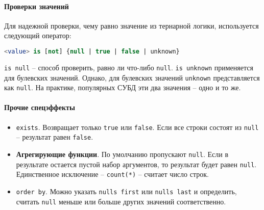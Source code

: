 \paragraph{Проверки значений}

Для надежной проверки, чему равно значение из тернарной логики, используется следующий оператор:

\begin{lstlisting}[language=SQL]
    <value> is [not] {null | true | false | unknown}
\end{lstlisting}

\texttt{is null} -- способ проверить, равно ли что-либо \texttt{null}.
\texttt{is unknown}
применяется для булевских значений. Однако, для булевских значений \texttt{unknown}
представляется как \texttt{null}. На практике, популярных СУБД эти два значения -- одно и
то же.

\paragraph{Прочие спецэффекты}

\begin{itemize}
	\item \texttt{exists}. Возвращает только \texttt{true} или \texttt{false}. Если
	      все строки
	      состоят из \texttt{null} -- результат равен \texttt{false}.
	\item \textbf{Агрегирующие функции}. По умолчанию пропускают \texttt{null}. Если в результате
	      остается пустой набор аргументов, то результат будет равен \texttt{null}. Единственное
	      исключение -- \texttt{count(*)} -- считает число строк.
	\item \texttt{order by}. Можно указать \texttt{nulls first} или \texttt{nulls last} и
	      определить, считать \texttt{null} меньше или больше других значений соответственно.
\end{itemize}
